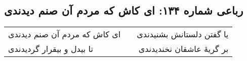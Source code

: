 \begin{center}
\section*{رباعی شماره ۱۳۴: ای کاش که مردم آن صنم دیدندی}
\label{sec:134}
\begin{longtable}{l p{0.5cm} r}
ای کاش که مردم آن صنم دیدندی
&&
یا گفتن دلستانش بشنیدندی
\\
تا بیدل و بیقرار گردیدندی
&&
بر گریهٔ عاشقان نخندیدندی
\\
\end{longtable}
\end{center}
